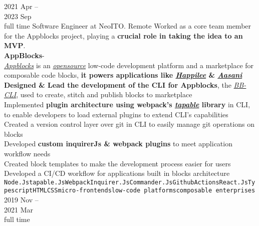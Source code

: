 \documentclass[9pt]{developercv} %
\begin{document}
\begin{entrylist}
	\entry
		{2021 Apr -- \\ 2023 Sep\\\footnotesize{full time}}
		{Software Engineer}
		{at}
		{NeoITO.}
		{Remote}
		{
			Worked as a core team member for the Appblocks project, playing a \textbf{crucial role in taking the idea to an MVP}.\smallskip\\
			\textbf{AppBlocks\texttrademark}\;-\;{\footnotesize\textcolor{darkgray}{ Low-code dev platform and marketplace.}}\\
			\href{https://www.appblocks.com/}{\emph{Appblocks}} is an \href{https://github.com/appblocks-hub}{\emph{opensource}} low-code development platform and a marketplace for composable code blocks, \textbf{it powers applications like \href{https://www.happilee.io/}{\emph{Happilee\texttrademark}} \& \href{https://www.aasanibooks.com/}{\emph{Aasani}\texttrademark}}\\
  			\faCaretRight\: \textbf{Designed \& Lead the development of the CLI for Appblocks}, the \href{https://github.com/appblocks-hub/BB-CLI}{\emph{BB-CLI}}, used to create, stitch and publish blocks to marketplace\\
			\faCaretRight\: Implemented \textbf{plugin architecture using webpack's \href{https://github.com/webpack/tapable}{\emph{tapable}} library} in CLI, to enable developers to load external plugins to extend CLI's capabilities\\
  			\faCaretRight\: Created a version control layer over git in CLI to easily manage git operations on blocks\\
			\faCaretRight\: Developed \textbf{custom inquirerJs \& webpack plugins} to meet application workflow needs\\
			\faCaretRight\: Created block templates to make the development process easier for users\\
			\faCaretRight\: Developed a CI/CD workflow for applications built in blocks architecture\\
			\texttt{Node.Js}\slashsep\texttt{tapable.Js}\slashsep\texttt{Webpack}\slashsep\texttt{Inquirer.Js}\slashsep\texttt{Commander.Js}\slashsep\texttt{GithubActions}\slashsep\texttt{React.Js}\slashsep\texttt{Typescript}\slashsep\texttt{HTML}\slashsep\texttt{CSS}\slashsep\texttt{micro-frontends}\slashsep\texttt{low-code platforms}\slashsep\texttt{composable enterprises}
		}
	\entry
		{2019 Nov --\\ 2021 Mar\\\footnotesize{full time}}

\end{entrylist}
\end{document}
